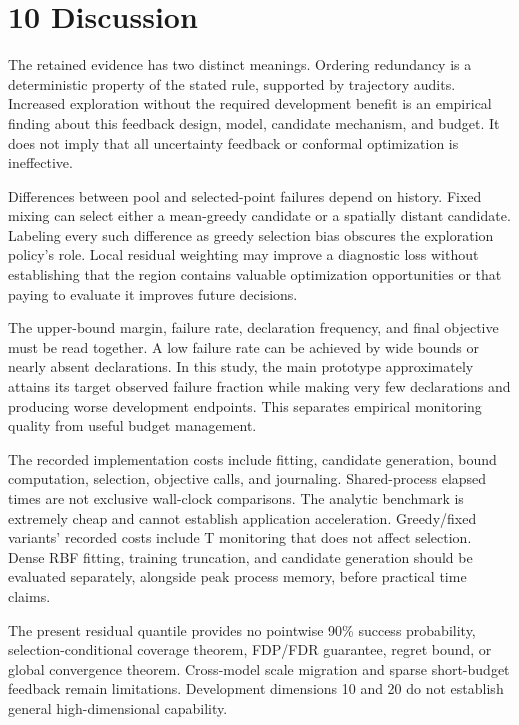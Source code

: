 \documentclass[11pt,a4paper]{article}
\begin{document}
\hypertarget{discussion}{%
\section{10 Discussion}\label{discussion}}

The retained evidence has two distinct meanings. Ordering redundancy is
a deterministic property of the stated rule, supported by trajectory
audits. Increased exploration without the required development benefit
is an empirical finding about this feedback design, model, candidate
mechanism, and budget. It does not imply that all uncertainty feedback
or conformal optimization is ineffective.

Differences between pool and selected-point failures depend on history.
Fixed mixing can select either a mean-greedy candidate or a spatially
distant candidate. Labeling every such difference as greedy selection
bias obscures the exploration policy's role. Local residual weighting
may improve a diagnostic loss without establishing that the region
contains valuable optimization opportunities or that paying to evaluate
it improves future decisions.

The upper-bound margin, failure rate, declaration frequency, and final
objective must be read together. A low failure rate can be achieved by
wide bounds or nearly absent declarations. In this study, the main
prototype approximately attains its target observed failure fraction
while making very few declarations and producing worse development
endpoints. This separates empirical monitoring quality from useful
budget management.

The recorded implementation costs include fitting, candidate generation,
bound computation, selection, objective calls, and journaling.
Shared-process elapsed times are not exclusive wall-clock comparisons.
The analytic benchmark is extremely cheap and cannot establish
application acceleration. Greedy/fixed variants' recorded costs include
T monitoring that does not affect selection. Dense RBF fitting, training
truncation, and candidate generation should be evaluated separately,
alongside peak process memory, before practical time claims.

The present residual quantile provides no pointwise 90\% success
probability, selection-conditional coverage theorem, FDP/FDR guarantee,
regret bound, or global convergence theorem. Cross-model scale migration
and sparse short-budget feedback remain limitations. Development
dimensions 10 and 20 do not establish general high-dimensional
capability.
\end{document}
